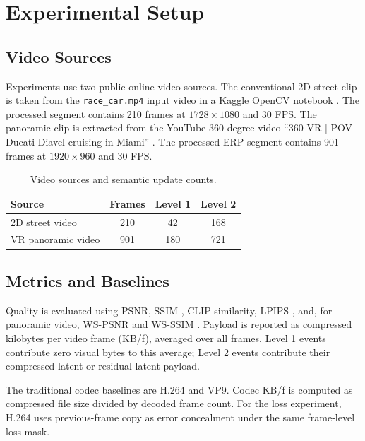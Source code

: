 \documentclass[conference]{IEEEtran}
\begin{document}

\section{Experimental Setup}

\subsection{Video Sources}

Experiments use two public online video sources. The conventional 2D street clip is taken from the \texttt{race\_car.mp4} input video in a Kaggle OpenCV notebook \cite{kaggle_opencv_video_input}. The processed segment contains 210 frames at $1728 \times 1080$ and 30 FPS. The panoramic clip is extracted from the YouTube 360-degree video ``360 VR | POV Ducati Diavel cruising in Miami'' \cite{youtube_vr_source}. The processed ERP segment contains 901 frames at $1920 \times 960$ and 30 FPS.

\begin{table}[t]
\caption{Video sources and semantic update counts.}
\label{tab:sources}
\centering
\footnotesize
\begin{tabular}{lccc}
\toprule
Source & Frames & Level 1 & Level 2 \\
\midrule
2D street video & 210 & 42 & 168 \\
VR panoramic video & 901 & 180 & 721 \\
\bottomrule
\end{tabular}
\end{table}

\subsection{Metrics and Baselines}

Quality is evaluated using PSNR, SSIM \cite{wang2004ssim}, CLIP similarity, LPIPS \cite{zhang2018lpips}, and, for panoramic video, WS-PSNR and WS-SSIM \cite{sun2017wspsnr}. Payload is reported as compressed kilobytes per video frame (KB/f), averaged over all frames. Level 1 events contribute zero visual bytes to this average; Level 2 events contribute their compressed latent or residual-latent payload.

The traditional codec baselines are H.264 and VP9. Codec KB/f is computed as compressed file size divided by decoded frame count. For the loss experiment, H.264 uses previous-frame copy as error concealment under the same frame-level loss mask.
\end{document}
